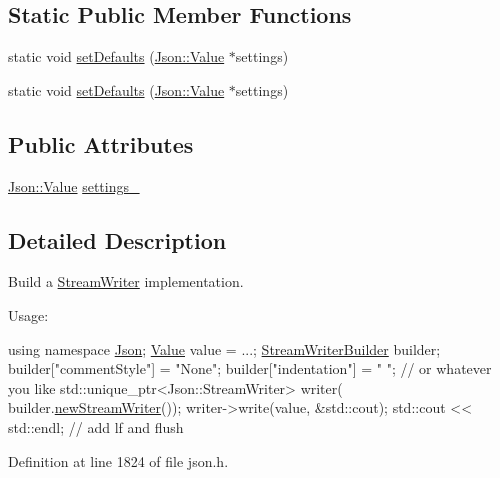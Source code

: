 \subsection*{Static Public Member Functions}
\begin{DoxyCompactItemize}
\item 
static void \hyperlink{class_json_1_1_stream_writer_builder_a53bf106b141e28637b01ad0ecd2acbf6}{set\+Defaults} (\hyperlink{class_json_1_1_value}{Json\+::\+Value} $\ast$settings)
\item 
static void \hyperlink{class_json_1_1_stream_writer_builder_a886224c308545b54ed242b436cdc90d3}{set\+Defaults} (\hyperlink{class_json_1_1_value}{Json\+::\+Value} $\ast$settings)
\end{DoxyCompactItemize}
\subsection*{Public Attributes}
\begin{DoxyCompactItemize}
\item 
\hyperlink{class_json_1_1_value}{Json\+::\+Value} \hyperlink{class_json_1_1_stream_writer_builder_a79bdf2e639a52f4e758c0b95bd1d3423}{settings\+\_\+}
\end{DoxyCompactItemize}


\subsection{Detailed Description}
Build a \hyperlink{class_json_1_1_stream_writer}{Stream\+Writer} implementation. 

Usage\+: 
\begin{DoxyCode}
\textcolor{keyword}{using namespace }\hyperlink{namespace_json}{Json};
\hyperlink{class_json_1_1_value}{Value} value = ...;
\hyperlink{class_json_1_1_stream_writer_builder}{StreamWriterBuilder} builder;
builder[\textcolor{stringliteral}{"commentStyle"}] = \textcolor{stringliteral}{"None"};
builder[\textcolor{stringliteral}{"indentation"}] = \textcolor{stringliteral}{"   "};  \textcolor{comment}{// or whatever you like}
std::unique\_ptr<Json::StreamWriter> writer(
    builder.\hyperlink{class_json_1_1_stream_writer_builder_ab9ee278609f88ae04a7c1a84e1f559e6}{newStreamWriter}());
writer->write(value, &std::cout);
std::cout << std::endl;  \textcolor{comment}{// add lf and flush}
\end{DoxyCode}
 

Definition at line 1824 of file json.\+h.



